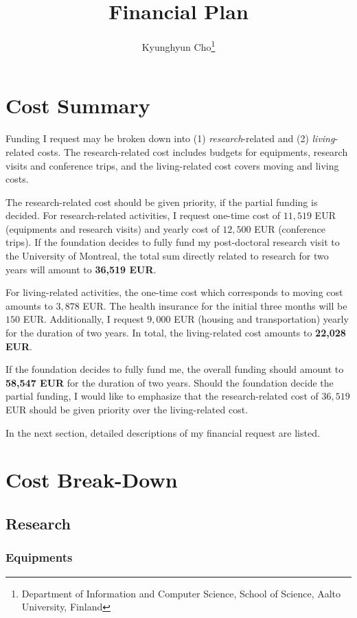\documentclass[11pt, oneside]{essay}
\title{Financial Plan}
\author{Kyunghyun Cho\thanks{Department of Information and
    Computer Science, School of Science, Aalto University,
             Finland}}
\begin{document}
\maketitle

\section{Cost Summary}

Funding I request may be broken down into (1)
\textit{research}-related and (2) \textit{living}-related
costs. The research-related cost includes budgets for equipments,
research visits and conference trips, and the living-related
cost covers moving and living costs.

The research-related cost should be given priority, if the
partial funding is decided. For research-related activities, I
request one-time cost of $11,519$ EUR (equipments and research
visits) and yearly cost of $12,500$ EUR (conference trips). If
the foundation decides to fully fund my post-doctoral research
visit to the University of Montreal, the total sum directly
related to research for two years will amount to \textbf{36,519
EUR}.

For living-related activities, the one-time cost which
corresponds to moving cost amounts to $3,878$ EUR. The health
insurance for the initial three months will be $150$ EUR.
Additionally, I request $9,000$ EUR (housing and transportation)
yearly for the duration of two years. In total, the
living-related cost amounts to \textbf{22,028 EUR}.

If the foundation decides to fully fund me, the overall funding
should amount to \textbf{58,547 EUR} for the duration of two
years. Should the foundation decide the partial funding, I would
like to emphasize that the research-related cost of $36,519$ EUR
should be given priority over the living-related cost.

In the next section, detailed descriptions of my financial
request are listed.


\section{Cost Break-Down}

\subsection{Research}

\subsubsection{Equipments}
\end{document}
